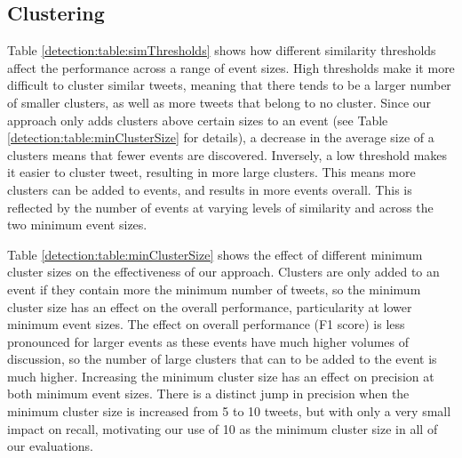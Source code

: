 \subsection{Clustering}
\label{detection:sec:simThresholds}
Table \ref{detection:table:simThresholds} shows how different similarity thresholds affect the performance across a range of event sizes.
High thresholds make it more difficult to cluster similar tweets, meaning that there tends to be a larger number of smaller clusters, as well as more tweets that belong to no cluster.
Since our approach only adds clusters above certain sizes to an event (see Table \ref{detection:table:minClusterSize} for details), a decrease in the average size of a clusters means that fewer events are discovered.
Inversely, a low threshold makes it easier to cluster tweet, resulting in more large clusters.
This means more clusters can be added to events, and results in more events overall.
This is reflected by the number of events at varying levels of similarity and across the two minimum event sizes.

Table \ref{detection:table:minClusterSize} shows the effect of different minimum cluster sizes on the effectiveness of our approach.
Clusters are only added to an event if they contain more the minimum number of tweets, so the minimum cluster size has an effect on the overall performance, particularity at lower minimum event sizes.
The effect on overall performance (F1 score) is less pronounced for larger events as these events have much higher volumes of discussion, so the number of large clusters that can to be added to the event is much higher.
Increasing the minimum cluster size has an effect on precision at both minimum event sizes.
There is a distinct jump in precision when the minimum cluster size is increased from 5 to 10 tweets, but with only a very small impact on recall, motivating our use of 10 as the minimum cluster size in all of our evaluations.

